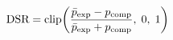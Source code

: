 \documentclass[preview]{standalone}
\begin{document}
\begin{align*}
\special{dvisvgm:raw <g id='unique000'>}\text{DSR} = \text{clip}\!\left(\frac{\bar{p}_{\text{exp}} - p_{\text{comp}}}{\bar{p}_{\text{exp}} + p_{\text{comp}}},\; 0,\; 1\right)\special{dvisvgm:raw </g>}
\end{align*}
\end{document}
